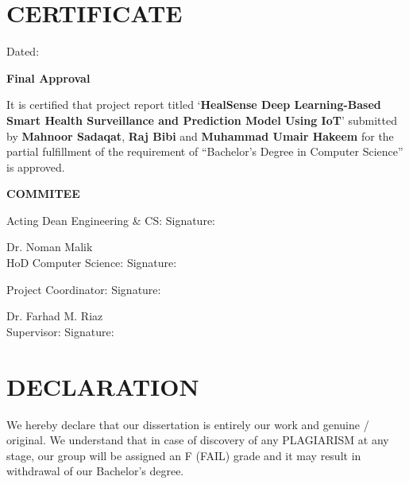 \documentclass[12pt,a4paper]{report}
\begin{document}
\chapter*{CERTIFICATE}
\noindent Dated: \underline{\hspace{4cm}}

\vspace{1cm}
\begin{center}
    \textbf{\Large Final Approval}
\end{center}
\vspace{0.5cm}

\noindent It is certified that project report titled `\textbf{HealSense Deep Learning-Based Smart Health Surveillance and Prediction Model Using IoT}' submitted by \textbf{Mahnoor Sadaqat}, \textbf{Raj Bibi} and \textbf{Muhammad Umair Hakeem} for the partial fulfillment of the requirement of ``Bachelor's Degree in Computer Science'' is approved.

\vspace{1cm}
\begin{center}
    \textbf{\Large COMMITEE}
\end{center}
\vspace{1cm}

\noindent Acting Dean Engineering \& CS: \hfill Signature: \underline{\hspace{4cm}}
\vspace{1cm}

\noindent Dr. Noman Malik \\
HoD Computer Science: \hfill Signature: \underline{\hspace{4cm}}
\vspace{1cm}

\noindent Project Coordinator: \hfill Signature: \underline{\hspace{4cm}}
\vspace{1cm}

\noindent Dr. Farhad M. Riaz \\
Supervisor: \hfill Signature: \underline{\hspace{4cm}}

\newpage
\chapter*{DECLARATION}
\noindent We hereby declare that our dissertation is entirely our work and genuine / original. We understand that in case of discovery of any PLAGIARISM at any stage, our group will be assigned an F (FAIL) grade and it may result in withdrawal of our Bachelor's degree.
\end{document}

